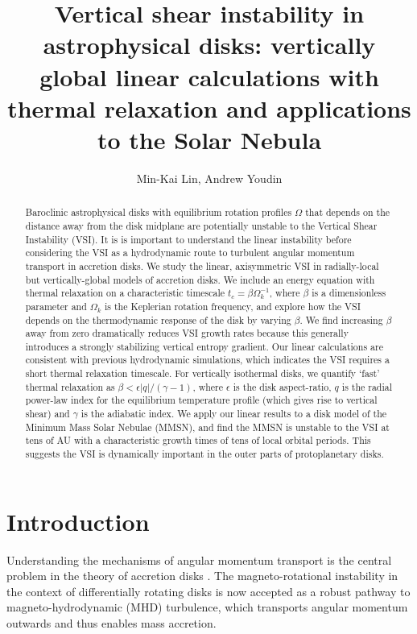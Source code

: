 \documentclass[iop]{emulateapj}
\begin{document}
\title{Vertical shear instability in astrophysical disks: vertically global linear calculations with thermal relaxation and applications to the Solar Nebula} 
\author{Min-Kai Lin, Andrew Youdin}

\begin{abstract}
  Baroclinic astrophysical disks with equilibrium rotation profiles
  $\Omega$ that depends on the distance away from the disk midplane are
  potentially unstable to the Vertical Shear Instability (VSI). It is
  is important to understand the linear instability before
  considering the VSI as a hydrodynamic route to turbulent angular
  momentum transport in accretion disks. We study the linear,
  axisymmetric VSI in radially-local but vertically-global models
  of accretion disks. We include an energy equation with thermal
  relaxation on a characteristic timescale $t_c=\beta\Omega_k^{-1}$,
  where $\beta$ is a dimensionless parameter and $\Omega_k$ is the
  Keplerian rotation frequency, and explore how the VSI depends on the
  thermodynamic response  of the disk by varying $\beta$. We find
  increasing $\beta$ away from zero dramatically reduces VSI growth
  rates because this generally introduces a strongly stabilizing
  vertical entropy gradient. Our linear calculations are consistent
  with previous hydrodynamic simulations, which indicates the VSI 
  requires a short thermal relaxation timescale. For vertically  
  isothermal disks, we quantify `fast'
  thermal relaxation as $\beta < \epsilon|q|/(\gamma-1)$, where
  $\epsilon$ is the disk aspect-ratio, $q$ is the radial power-law
  index for the equilibrium temperature profile (which gives rise to vertical 
  shear) and $\gamma$ is the adiabatic index. We apply our linear
  results to a disk model of the Minimum Mass Solar Nebulae (MMSN), and
  find the MMSN is unstable to the VSI at tens of AU with a
  characteristic growth times of tens of local orbital periods. This 
  suggests the VSI is  dynamically important in the outer parts of protoplanetary disks. 
\end{abstract}

\section{Introduction}
Understanding the mechanisms of angular momentum transport is the
central problem in the theory of accretion disks 
\citep{lyndenbell74}. The   
magneto-rotational instability in the context of differentially
rotating disks \citep[MRI,][]{balbus91} is now accepted as a robust
pathway to magneto-hydrodynamic (MHD) turbulence, which transports
angular momentum outwards and thus enables mass accretion. 
\end{document}
